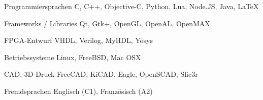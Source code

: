 
\begin{cvskills}

  \cvskill
    {Programmiersprachen} %
    {C, C++, Objective-C, Python, Lua, Node.JS, Java, LaTeX} %
    
  \cvskill
    {Frameworks / Libraries} %
    {Qt, Gtk+, OpenGL, OpenAL, OpenMAX} %

  \cvskill
    {FPGA-Entwurf} %
    {VHDL, Verilog, MyHDL, Yosys} %
    
  \cvskill
    {Betriebssysteme} %
    {Linux, FreeBSD, Mac OSX} %
    
  \cvskill
    {CAD, 3D-Druck} %
    {FreeCAD, KiCAD, Eagle, OpenSCAD, Slic3r} %

  \cvskill
    {Fremdsprachen} %
    {Englisch (C1), Französisch (A2)} %

\end{cvskills}
